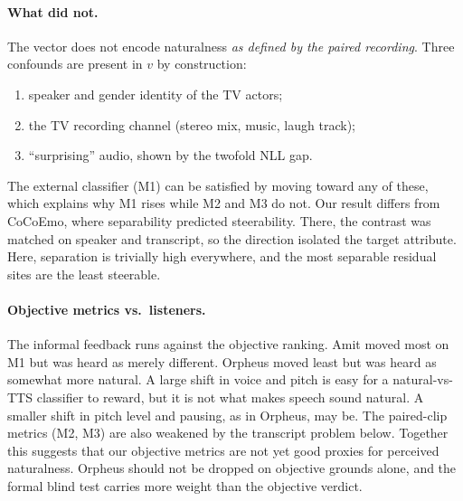 \documentclass[11pt]{article}
\begin{document}
\paragraph{What did not.} The vector does not encode naturalness \emph{as defined by the paired recording}. Three confounds are present in $v$ by construction:
\begin{enumerate}
\item speaker and gender identity of the TV actors;
\item the TV recording channel (stereo mix, music, laugh track);
\item ``surprising'' audio, shown by the twofold NLL gap.
\end{enumerate}
The external classifier (M1) can be satisfied by moving toward any of these, which explains why M1 rises while M2 and M3 do not. Our result differs from CoCoEmo, where separability predicted steerability. There, the contrast was matched on speaker and transcript, so the direction isolated the target attribute. Here, separation is trivially high everywhere, and the most separable residual sites are the least steerable.

\paragraph{Objective metrics vs.\ listeners.} The informal feedback runs against the objective ranking. Amit moved most on M1 but was heard as merely different. Orpheus moved least but was heard as somewhat more natural. A large shift in voice and pitch is easy for a natural-vs-TTS classifier to reward, but it is not what makes speech sound natural. A smaller shift in pitch level and pausing, as in Orpheus, may be. The paired-clip metrics (M2, M3) are also weakened by the transcript problem below. Together this suggests that our objective metrics are not yet good proxies for perceived naturalness. Orpheus should not be dropped on objective grounds alone, and the formal blind test carries more weight than the objective verdict.
\end{document}

